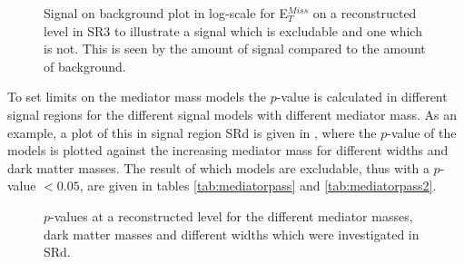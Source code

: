  \begin{figure}[H] %
    \hfill
    \caption{Signal on background plot in log-scale for E$^{Miss}_T$ on a reconstructed level in SR3 to illustrate a signal which is excludable and one which is not. This is seen by the amount of signal compared to the amount of background.}
    \label{fig:sigback}
  \end{figure}

To set limits on the mediator mass models the $p$-value is calculated in different signal regions for the different signal models with different mediator mass. As an example, a plot of this in signal region SRd is given in , where the $p$-value of the models is plotted against the increasing mediator mass for different widths and dark matter masses. The result of which models are excludable, thus with a $p$-value $<0.05$, are given in tables \ref{tab:mediatorpass} and \ref{tab:mediatorpass2}.

 \begin{figure}[H] %
    \hfill
    \caption{$p$-values at a reconstructed level for the different mediator masses, dark matter masses and different widths which were investigated in SRd.}
    \label{fig:modelex}
  \end{figure}



